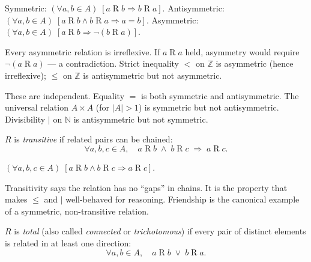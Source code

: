 \begin{remark}
Symmetric: $(\forall a,b \in A)\;[a \mathrel{R} b \Rightarrow b \mathrel{R} a]$.
Antisymmetric: $(\forall a,b \in A)\;
[a \mathrel{R} b \land b \mathrel{R} a \Rightarrow a = b]$.
Asymmetric: $(\forall a,b \in A)\;
[a \mathrel{R} b \Rightarrow \lnot(b \mathrel{R} a)]$.
\end{remark}

\begin{remark}
Every asymmetric relation is irreflexive.
If $a \mathrel{R} a$ held, asymmetry would require $\lnot(a \mathrel{R} a)$ —
a contradiction.
Strict inequality $<$ on $\mathbb{Z}$ is asymmetric (hence irreflexive);
$\leq$ on $\mathbb{Z}$ is antisymmetric but not asymmetric.
\end{remark}

\begin{remark}
These are independent.
Equality $=$ is both symmetric and antisymmetric.
The universal relation $A \times A$ (for $|A| > 1$) is symmetric but
not antisymmetric.
Divisibility $\mid$ on $\mathbb{N}$ is antisymmetric but not symmetric.
\end{remark}

\begin{tcolorbox}[colback=propbox, colframe=propborder, arc=2pt,
  left=6pt, right=6pt, top=4pt, bottom=4pt,
  title={\small\textbf{Definition (Transitive)}},
  fonttitle=\small\bfseries]
\label{def:rel-transitive}
$R$ is \emph{transitive} if related pairs can be chained:
\[
  \forall a,b,c \in A,\quad
  a \mathrel{R} b \;\land\; b \mathrel{R} c \;\Rightarrow\; a \mathrel{R} c.
\]
\end{tcolorbox}

\begin{remark}
$(\forall a,b,c \in A)\;
[a \mathrel{R} b \land b \mathrel{R} c \Rightarrow a \mathrel{R} c]$.
\end{remark}

\begin{remark}[Intuition]
Transitivity says the relation has no ``gaps'' in chains.
It is the property that makes $\leq$ and $\mid$ well-behaved for reasoning.
Friendship is the canonical example of a symmetric, non-transitive relation.
\end{remark}

\begin{tcolorbox}[colback=propbox, colframe=propborder, arc=2pt,
  left=6pt, right=6pt, top=4pt, bottom=4pt,
  title={\small\textbf{Definition (Total / Connected)}},
  fonttitle=\small\bfseries]
\label{def:rel-total}
$R$ is \emph{total} (also called \emph{connected} or \emph{trichotomous})
if every pair of distinct elements is related in at least one direction:
\[
  \forall a,b \in A,\quad
  a \mathrel{R} b \;\lor\; b \mathrel{R} a.
\]
\end{tcolorbox}

